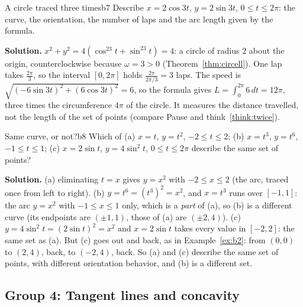\documentclass[11pt]{article}
\begin{document}
\begin{exmp}{A circle traced three times}{b7}
Describe $x=2\cos3t$, $y=2\sin3t$, $0\le t\le2\pi$: the curve, the orientation, the number of laps and the arc length given by the formula.

\textbf{Solution.} $x^2+y^2=4\left(\cos^23t+\sin^23t\right)=4$: a circle of radius $2$ about the origin, counterclockwise because $\omega=3>0$ (Theorem~\ref{thm:circell}). One lap takes $\frac{2\pi}3$, so the interval $[0,2\pi]$ holds $\frac{2\pi}{2\pi/3}=3$ laps. The speed is $\sqrt{(-6\sin3t)^2+(6\cos3t)^2}=6$, so the formula gives $L=\int_0^{2\pi}6\,dt=12\pi$, three times the circumference $4\pi$ of the circle. It measures the distance travelled, not the length of the set of points (compare Pause and think~\ref{think:twice}).
\end{exmp}

\begin{exmp}{Same curve, or not?}{b8}
Which of (a) $x=t$, $y=t^2$, $-2\le t\le2$; (b) $x=t^3$, $y=t^6$, $-1\le t\le1$; (c) $x=2\sin t$, $y=4\sin^2t$, $0\le t\le2\pi$ describe the same set of points?

\textbf{Solution.} (a) eliminating $t=x$ gives $y=x^2$ with $-2\le x\le2$ (the arc, traced once from left to right). (b) $y=t^6=(t^3)^2=x^2$, and $x=t^3$ runs over $[-1,1]$: the arc $y=x^2$ with $-1\le x\le1$ only, which is a \emph{part} of (a), so (b) is a different curve (its endpoints are $(\pm1,1)$, those of (a) are $(\pm2,4)$). (c) $y=4\sin^2t=\left(2\sin t\right)^2=x^2$ and $x=2\sin t$ takes every value in $[-2,2]$: the same set as (a). But (c) goes out and back, as in Example~\ref{ex:b2}: from $(0,0)$ to $(2,4)$, back, to $(-2,4)$, back. So (a) and (c) describe the same set of points, with different orientation behavior, and (b) is a different set.
\end{exmp}

\subsection*{Group 4: Tangent lines and concavity}
\end{document}
